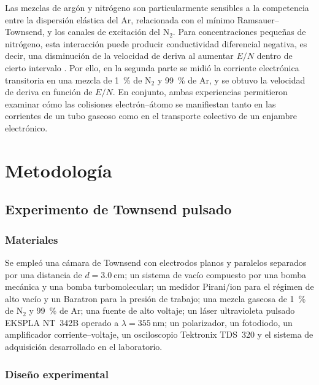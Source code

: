 Las mezclas de argón y nitrógeno son particularmente sensibles a la competencia entre la dispersión elástica del Ar, relacionada con el mínimo Ramsauer--Townsend, y los canales de excitación del $\mathrm{N_2}$. Para concentraciones pequeñas de nitrógeno, esta interacción puede producir conductividad diferencial negativa, es decir, una disminución de la velocidad de deriva al aumentar $E/N$ dentro de cierto intervalo \cite{Jovanovic2009}. Por ello, en la segunda parte se midió la corriente electrónica transitoria en una mezcla de \SI{1}{\percent} de $\mathrm{N_2}$ y \SI{99}{\percent} de Ar, y se obtuvo la velocidad de deriva en función de $E/N$. En conjunto, ambas experiencias permitieron examinar cómo las colisiones electrón--átomo se manifiestan tanto en las corrientes de un tubo gaseoso como en el transporte colectivo de un enjambre electrónico.

\section{Metodología}
\label{sec:metodologia}

\subsection{Experimento de Townsend pulsado}
\label{subsec:townsend-pulsado}

\subsubsection{Materiales}
\label{subsubsec:materiales-townsend}

Se empleó una cámara de Townsend con electrodos planos y paralelos separados por una distancia de $d=\SI{3.0}{\centi\metre}$; un sistema de vacío compuesto por una bomba mecánica y una bomba turbomolecular; un medidor Pirani/ion para el régimen de alto vacío y un Baratron para la presión de trabajo; una mezcla gaseosa de \SI{1}{\percent} de $\mathrm{N_2}$ y \SI{99}{\percent} de Ar; una fuente de alto voltaje; un láser ultravioleta pulsado EKSPLA NT~342B operado a $\lambda=\SI{355}{\nano\metre}$; un polarizador, un fotodiodo, un amplificador corriente--voltaje, un osciloscopio Tektronix TDS~320 y el sistema de adquisición desarrollado en el laboratorio.

\subsubsection{Diseño experimental}
\label{subsubsec:diseno-townsend}

